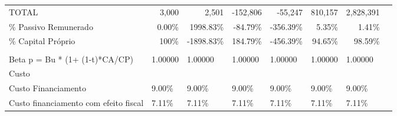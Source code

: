 \documentclass[11pt]{article}
\begin{document}
\begin{adjustbox}{center}
\begin{tabular}{lrrrrrrr}
			\multicolumn{1}{|l|}{TOTAL}                                   & \multicolumn{1}{r|}{3,000}      & \multicolumn{1}{r|}{2,501}     & \multicolumn{1}{r|}{-152,806}  & \multicolumn{1}{r|}{-55,247}    & \multicolumn{1}{r|}{810,157}  & \multicolumn{1}{r|}{2,828,391}   &                                \\ \cline{1-7}
			\multicolumn{1}{|l|}{\% Passivo Remunerado}                   & \multicolumn{1}{r|}{0.00\%}    & \multicolumn{1}{r|}{1998.83\%}  & \multicolumn{1}{r|}{-84.79\%} & \multicolumn{1}{r|}{-356.39\%} & \multicolumn{1}{r|}{5.35\%}  & \multicolumn{1}{r|}{1.41\%}    &                                \\ \cline{1-7}
			\multicolumn{1}{|l|}{\% Capital Próprio}                      & \multicolumn{1}{r|}{100\%}     & \multicolumn{1}{r|}{-1898.83\%} & \multicolumn{1}{r|}{184.79\%} & \multicolumn{1}{r|}{-456.39\%}  & \multicolumn{1}{r|}{94.65\%} & \multicolumn{1}{r|}{98.59\%}   &                                \\ \cline{1-7}
			& \multicolumn{1}{l}{}           & \multicolumn{1}{l}{}           & \multicolumn{1}{l}{}          & \multicolumn{1}{l}{}           & \multicolumn{1}{l}{}         & \multicolumn{1}{l}{}           & \multicolumn{1}{l}{}           \\ \cline{2-7}
			\multicolumn{1}{l|}{Beta p = Bu * (1+ (1-t)*CA/CP)}           & \multicolumn{1}{l|}{1.00000}   & \multicolumn{1}{l|}{1.00000}   & \multicolumn{1}{l|}{1.00000}  & \multicolumn{1}{l|}{1.00000}   & \multicolumn{1}{l|}{1.00000} & \multicolumn{1}{l|}{1.00000}   & \multicolumn{1}{l}{}           \\ \cline{2-7}
			Custo                                                         & \multicolumn{1}{l}{}           & \multicolumn{1}{l}{}           & \multicolumn{1}{l}{}          & \multicolumn{1}{l}{}           & \multicolumn{1}{l}{}         & \multicolumn{1}{l}{}           & \multicolumn{1}{l}{}           \\ \cline{1-7}
			\multicolumn{1}{|l|}{Custo Financiamento}                     & \multicolumn{1}{l|}{9.00\%}    & \multicolumn{1}{l|}{9.00\%}    & \multicolumn{1}{l|}{9.00\%}   & \multicolumn{1}{l|}{9.00\%}    & \multicolumn{1}{l|}{9.00\%}  & \multicolumn{1}{l|}{9.00\%}    & \multicolumn{1}{l}{}           \\ \cline{1-7}
			\multicolumn{1}{|l|}{Custo financiamento com efeito fiscal}   & \multicolumn{1}{l|}{7.11\%}    & \multicolumn{1}{l|}{7.11\%}    & \multicolumn{1}{l|}{7.11\%}   & \multicolumn{1}{l|}{7.11\%}    & \multicolumn{1}{l|}{7.11\%}  & \multicolumn{1}{l|}{7.11\%}    & \multicolumn{1}{l}{}           \\ \cline{1-7}

\end{tabular}
\end{adjustbox}
\end{document}
